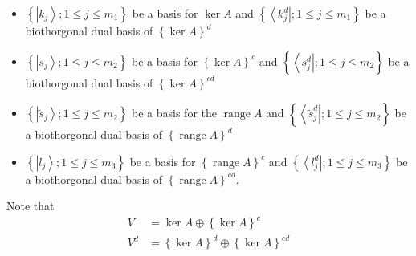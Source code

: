 \documentclass[aps,preprint]{revtex4}%
\begin{document}
\begin{itemize}
\item $\left\{  \left|  k_{j}\right\rangle ;1\leq j\leq m_{1}\right\}  $ be a
basis for $\ker A$ and $\left\{  \left\langle k_{j}^{d}\right|  ;1\leq j\leq
m_{1}\right\}  $ be a biothorgonal dual basis of $\left\{  \ker A\right\}
^{d}$

\item $\left\{  \left|  s_{j}\right\rangle ;1\leq j\leq m_{2}\right\}  $ be a
basis for $\left\{  \ker A\right\}  ^{c}$ and $\left\{  \left\langle s_{j}%
^{d}\right|  ;1\leq j\leq m_{2}\right\}  $ be a biothorgonal dual basis of
$\left\{  \ker A\right\}  ^{cd}$

\item $\left\{  \left|  \tilde{s}_{j}\right\rangle ;1\leq j\leq m_{2}\right\}
$ be a basis for the $\operatorname{range}A$ and $\left\{  \left\langle
\tilde{s}_{j}^{d}\right|  ;1\leq j\leq m_{2}\right\}  $ be a biothorgonal dual
basis of $\left\{  \operatorname{range}A\right\}  ^{d}$

\item $\left\{  \left|  l_{j}\right\rangle ;1\leq j\leq m_{3}\right\}  $ be a
basis for $\left\{  \operatorname{range}A\right\}  ^{c}$ and $\left\{
\left\langle l_{j}^{d}\right|  ;1\leq j\leq m_{3}\right\}  $ be a biothorgonal
dual basis of $\left\{  \operatorname{range}A\right\}  ^{cd}$.
\end{itemize}

Note that
\begin{align}
V  & =\ker A\oplus\left\{  \ker A\right\}  ^{c}\nonumber\\
V^{d}  & =\left\{  \ker A\right\}  ^{d}\oplus\left\{  \ker A\right\}  ^{cd}%
\end{align}
\end{document}
